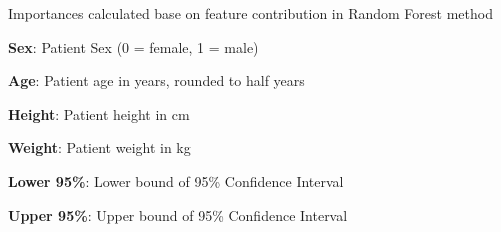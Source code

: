 \documentclass[11pt]{article}
\begin{document}
\begin{table}[h]
\caption{\protect\hyperlink{file-table-3-pkl}{Feature importances from the Random Forest model, including confidence intervals}}
\label{table:feature_importances}
\begin{threeparttable}
\renewcommand{\TPTminimum}{\linewidth}
\begin{tablenotes}
\footnotesize
\item Importances calculated base on feature contribution in Random Forest method
\item \textbf{Sex}: Patient Sex (0 = female, 1 = male)
\item \textbf{Age}: Patient age in years, rounded to half years
\item \textbf{Height}: Patient height in cm
\item \textbf{Weight}: Patient weight in kg
\item \textbf{Lower 95\%}: Lower bound of 95\% Confidence Interval
\item \textbf{Upper 95\%}: Upper bound of 95\% Confidence Interval
\end{tablenotes}
\end{threeparttable}
\end{table}
\end{document}
